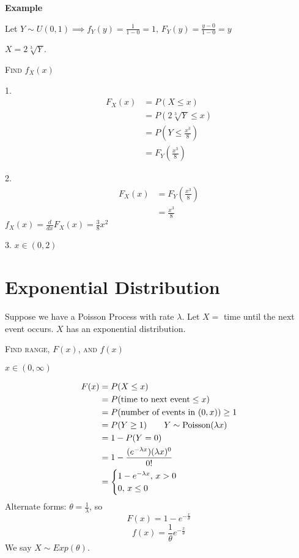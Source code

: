 \textbf{Example}

Let $ Y \sim U(0,1)\implies f_Y(y)=\frac{1}{1-0}=1,\,
    F_Y(y)=\frac{y-0}{1-0}=y $

$ X=2\sqrt[3]{Y} $.

\textsc{Find $ f_X(x) $}

1.
\begin{align*}
    F_X(x) & =P(X\le x)                        \\
           & =P\left(2\sqrt[3]{Y}\le x\right)  \\
           & =P\left(Y\le \frac{x^3}{8}\right) \\
           & =F_Y\left(\frac{x^3}{8} \right)
\end{align*}

2.
\begin{align*}
    F_X(x) & =F_Y\left(\frac{x^3}{8} \right) \\
           & =\frac{x^3}{8}
\end{align*}
$ f_X(x)=\frac{d}{dx}F_X(x)=\frac{3}{8}x^2 $

3. $ x\in(0,2) $

\section{Exponential Distribution}
Suppose we have a Poisson Process with rate $ \lambda $. Let
$ X= $ time until the next event occurs. $ X $ has an exponential distribution.

\textsc{Find range, $ F(x) $, and $ f(x) $}

$ x\in(0,\infty) $

\begin{align*}
    F(x) & =P(X\le x)                                     \\
         & =P(\text{time to next event}\le x)             \\
         & =P(\text{number of events in $ (0,x) $}) \ge 1 \\
         & =P(Y\ge 1)\qquad Y \sim \operatorname{Poisson}(\lambda x)   \\
         & =1-P(Y=0)                                      \\
         & =1-\frac{(e^{-\lambda x})(\lambda x)^0}{0!}    \\
         & =
    \begin{cases}
        1-e^{-\lambda x},\, x>0 \\
        0,\, x\le 0
    \end{cases}
\end{align*}
Alternate forms: $ \theta=\frac{1}{\lambda} $, so
\[ F(x)=1-e^{-\frac{x}{\theta}} \]
\[ f(x)=\frac{1}{\theta}e^{-\frac{x}{\theta}} \]
We say $ X \sim Exp(\theta) $.
